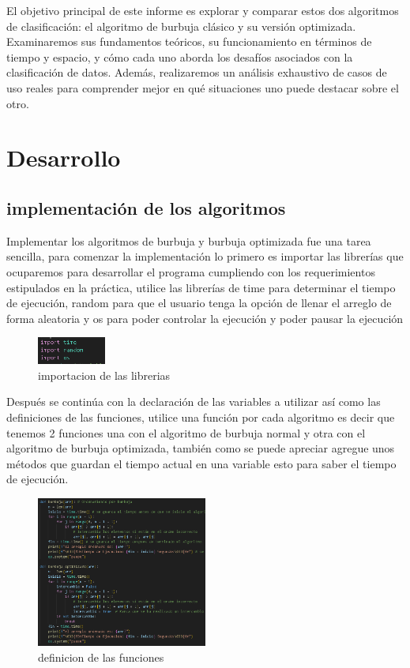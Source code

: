 \documentclass[journal]{IEEEtran}
\begin{document}
El objetivo principal de este informe es explorar y comparar estos dos 
algoritmos de clasificación: el algoritmo de burbuja clásico y su versión 
optimizada. Examinaremos sus fundamentos teóricos, su funcionamiento en 
términos de tiempo y espacio, y cómo cada uno aborda los desafíos asociados 
con la clasificación de datos. Además, realizaremos un análisis exhaustivo 
de casos de uso reales para comprender mejor en qué situaciones uno puede 
destacar sobre el otro.


\section{Desarrollo}
\subsection{implementación de los algoritmos}
Implementar los algoritmos de burbuja y burbuja optimizada fue una tarea 
sencilla, para comenzar la implementación lo primero es importar 
las librerías que ocuparemos para desarrollar el programa cumpliendo 
con los requerimientos estipulados en la práctica, utilice las librerías 
de time para determinar el tiempo de ejecución, random para que el usuario 
tenga la opción de llenar el arreglo de forma aleatoria y os para poder 
controlar la ejecución y poder pausar la ejecución
\begin{figure}[H]
    \centering
    \begin{adjustbox}{clip=false}
      \includegraphics[width=0.2\textwidth]{1.PNG}
    \end{adjustbox}
    \caption{importacion de las librerias}
  \end{figure}


Después se continúa con la declaración de las variables a 
utilizar así como las definiciones de las funciones, 
utilice una función por cada algoritmo es decir que tenemos
2 funciones una con el algoritmo de burbuja normal y otra 
con el algoritmo de burbuja optimizada, también como se 
puede apreciar agregue unos métodos que guardan el tiempo 
actual en una variable esto para saber el tiempo de ejecución.


\begin{figure}[H]
    \centering
    \begin{adjustbox}{clip=false}
      \includegraphics[width=0.5\textwidth]{2.PNG}
    \end{adjustbox}
    \caption{definicion de las funciones}
  \end{figure}
\end{document}
